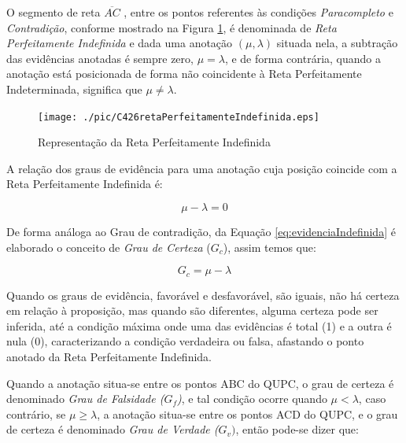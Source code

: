 O segmento de reta $\overline{ AC }$ , entre os pontos referentes às condições \emph{Paracompleto} e \emph{Contradição}, conforme mostrado na Figura \ref{fig:retaPerfeitamenteIndefinida}, é denominada de \emph{Reta Perfeitamente Indefinida} e dada uma anotação $(\mu, \lambda )$ situada nela, a subtração das evidências anotadas é sempre zero, $\mu = \lambda$, e de forma contrária, quando a anotação está posicionada de forma não coincidente à Reta Perfeitamente Indeterminada, significa que $\mu \neq \lambda$.

\begin{figure}[!htb]
\center\texttt{[image: ./pic/C426retaPerfeitamenteIndefinida.eps]}
\caption{Representação da Reta Perfeitamente Indefinida}
\label{fig:retaPerfeitamenteIndefinida}
\end{figure}

A relação dos graus de evidência para uma anotação cuja posição coincide com a Reta Perfeitamente Indefinida é: 

\begin{center}
\begin{equation}
\mu - \lambda = 0
\label{eq:evidenciaIndefinida}
\end{equation}
\end{center}

De forma análoga ao Grau de contradição, da Equação \ref{eq:evidenciaIndefinida} é elaborado o conceito de \emph{Grau de Certeza} ($G _c$), assim temos que: 

\begin{center}
\begin{equation}
G _{c} = \mu - \lambda
\label{eq:grauCerteza}
\end{equation}
\end{center}

Quando os graus de evidência, favorável e desfavorável, são iguais, não há certeza em relação à proposição, mas quando são diferentes, alguma certeza pode ser inferida, até a condição máxima onde uma das evidências é total (1) e a outra é nula (0), caracterizando a condição verdadeira ou falsa, afastando o ponto anotado da Reta Perfeitamente Indefinida. 

Quando a anotação situa-se entre os pontos ABC do QUPC, o grau de certeza é denominado \emph{Grau de Falsidade ($G _f$)}, e tal condição ocorre quando $\mu < \lambda $, caso contrário, se $\mu \ge \lambda $, a anotação situa-se entre os pontos ACD do QUPC, e o grau de certeza é denominado \emph{Grau de Verdade ($G _v)$}, então pode-se dizer que:

